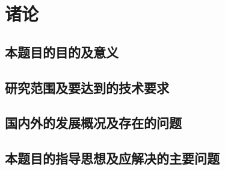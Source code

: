 \chapter{诸论}
\section{本题目的目的及意义}
\zhlipsum[2] %
\section{研究范围及要达到的技术要求}
\zhlipsum[3] %
\section{国内外的发展概况及存在的问题}
\zhlipsum[4-5] %
\section{本题目的指导思想及应解决的主要问题}
\zhlipsum[6-7] %

